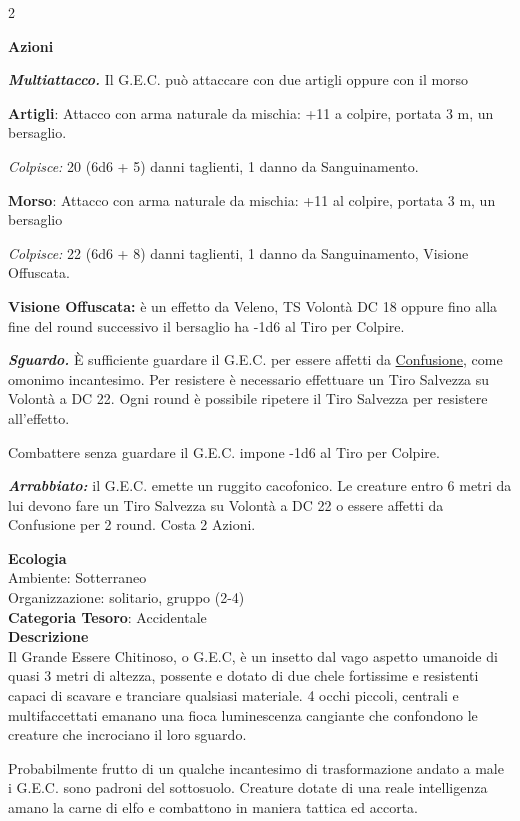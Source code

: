 \begin{multicols}{2}
{\textbf{Azioni}

\emph{\textbf{Multiattacco.}} Il G.E.C. può attaccare con due artigli oppure con il morso

\textbf{Artigli}: Attacco con arma naturale da mischia: +11 a colpire, portata 3 m, un bersaglio.

\emph{Colpisce:} 20 (6d6 + 5) danni taglienti, 1 danno da Sanguinamento.

\textbf{Morso}: Attacco con arma naturale da mischia: +11 al colpire, portata 3 m, un bersaglio

\emph{Colpisce:} 22 (6d6 + 8) danni taglienti, 1 danno da Sanguinamento, Visione Offuscata.

\textbf{Visione Offuscata:} è un effetto da Veleno, TS Volontà DC 18 oppure fino alla fine del round successivo il bersaglio ha -1d6 al Tiro per Colpire.

\emph{\textbf{Sguardo.}} È sufficiente guardare il G.E.C. per essere affetti da \hyperlink{Confusione}{Confusione}, come omonimo incantesimo. Per resistere è necessario effettuare un Tiro Salvezza su Volontà a DC 22. Ogni round è possibile ripetere il Tiro Salvezza per resistere all'effetto.

Combattere senza guardare il G.E.C. impone -1d6 al Tiro per Colpire.

\emph{\textbf{Arrabbiato:}} il G.E.C. emette un ruggito cacofonico. Le creature entro 6 metri da lui devono fare un Tiro Salvezza su Volontà a DC 22 o essere affetti da Confusione per 2 round. Costa 2 Azioni.

\textbf{Ecologia}\\
Ambiente: Sotterraneo\\
Organizzazione: solitario, gruppo (2-4) \\
\textbf{Categoria Tesoro}: Accidentale\\
\textbf{Descrizione}\\
Il Grande Essere Chitinoso, o G.E.C, è un insetto dal vago aspetto umanoide di quasi 3 metri di altezza, possente e dotato di due chele fortissime e resistenti capaci di scavare e tranciare qualsiasi materiale. 4 occhi piccoli, centrali e multifaccettati emanano una fioca luminescenza cangiante che confondono le creature che incrociano il loro sguardo.

Probabilmente frutto di un qualche incantesimo di trasformazione andato a male i G.E.C. sono padroni del sottosuolo. Creature dotate di una reale intelligenza amano la carne di elfo e combattono in maniera tattica ed accorta.

}
\end{multicols}
